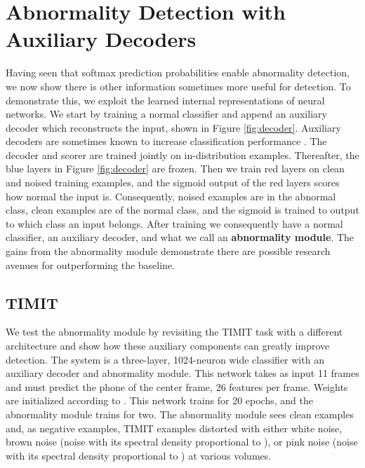 \documentclass{article}
\begin{document}
\section{Abnormality Detection with Auxiliary Decoders}
\label{sec:auxiliary}
Having seen that softmax prediction probabilities enable abnormality detection, we now show there is other information sometimes more useful for detection. To demonstrate this, we exploit the learned internal representations of neural networks. We start by training a normal classifier and append an auxiliary decoder which reconstructs the input, shown in Figure \ref{fig:decoder}. Auxiliary decoders are sometimes known to increase classification performance \citep{swwae}. The decoder and scorer are trained jointly on in-distribution examples. Thereafter, the blue layers in Figure \ref{fig:decoder} are frozen. Then we train red layers on clean and noised training examples, and the sigmoid output of the red layers scores how normal the input is. Consequently, noised examples are in the abnormal class, clean examples are of the normal class, and the sigmoid is trained to output to which class an input belongs. After training we consequently have a normal classifier, an auxiliary decoder, and what we call an \textbf{abnormality module}. The gains from the abnormality module demonstrate there are possible research avenues for outperforming the baseline.

\subsection{TIMIT}
We test the abnormality module by revisiting the TIMIT task with a different architecture and show how these auxiliary components can greatly improve detection. The system is a three-layer, 1024-neuron wide classifier with an auxiliary decoder and abnormality module. This network takes as input 11 frames and must predict the phone of the center frame, 26 features per frame. Weights are initialized according to \citep{init}. This network trains for 20 epochs, and the abnormality module trains for two. The abnormality module sees clean examples and, as negative examples, TIMIT examples distorted with either white noise, brown noise (noise with its spectral density proportional to ), or pink noise (noise with its spectral density proportional to ) at various volumes. 
\end{document}
